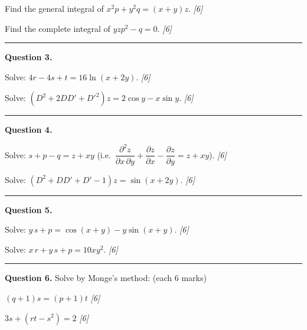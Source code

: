\documentclass[11pt,a4paper]{article}
\newcommand{\pts}[1]{\hfill   \textit{[#1]}}
\begin{document}
\begin{parts}
  \item Find the general integral of $x^2 p + y^2 q = (x + y)z$. \pts{6}
  \item Find the complete integral of $y z p^2 - q = 0$. \pts{6}
\end{parts}

\medskip\rule{\linewidth}{0.2pt}

\medskip


\noindent   \textbf{Question 3.}

\begin{parts}
  \item Solve: $4r - 4s + t = 16\ln(x + 2y)$. \pts{6}
  \item Solve: $(D^2 + 2DD' + D'^2)z = 2\cos y - x\sin y$. \pts{6}
\end{parts}

\medskip\rule{\linewidth}{0.2pt}

\medskip


\noindent   \textbf{Question 4.}

\begin{parts}
  \item Solve: $s + p - q = z + xy$ (i.e.\ $\dfrac{\partial^2 z}{\partial x\,\partial y} + \dfrac{\partial z}{\partial x} - \dfrac{\partial z}{\partial y} = z + xy$). \pts{6}
  \item Solve: $(D^2 + DD' + D' - 1)z = \sin(x + 2y)$. \pts{6}
\end{parts}

\medskip\rule{\linewidth}{0.2pt}

\medskip


\noindent   \textbf{Question 5.}

\begin{parts}
  \item Solve: $y\,s + p = \cos(x + y) - y\sin(x + y)$. \pts{6}
  \item Solve: $x\,r + y\,s + p = 10xy^2$. \pts{6}
\end{parts}

\medskip\rule{\linewidth}{0.2pt}

\medskip


\noindent   \textbf{Question 6.}
Solve by Monge's method: (each 6 marks)

\begin{parts}
  \item $(q + 1)s = (p + 1)t$ \pts{6}
  \item $3s + (rt - s^2) = 2$ \pts{6}
\end{parts}
\end{document}
